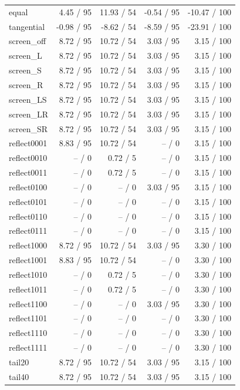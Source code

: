 \begin{longtable}{@{}lrrrr@{}}
equal & 4.45 / 95 & 11.93 / 54 & -0.54 / 95 & -10.47 / 100\\
tangential & -0.98 / 95 & -8.62 / 54 & -8.59 / 95 & -23.91 / 100\\
screen\_\allowbreak off & 8.72 / 95 & 10.72 / 54 & 3.03 / 95 & 3.15 / 100\\
screen\_\allowbreak L & 8.72 / 95 & 10.72 / 54 & 3.03 / 95 & 3.15 / 100\\
screen\_\allowbreak S & 8.72 / 95 & 10.72 / 54 & 3.03 / 95 & 3.15 / 100\\
screen\_\allowbreak R & 8.72 / 95 & 10.72 / 54 & 3.03 / 95 & 3.15 / 100\\
screen\_\allowbreak LS & 8.72 / 95 & 10.72 / 54 & 3.03 / 95 & 3.15 / 100\\
screen\_\allowbreak LR & 8.72 / 95 & 10.72 / 54 & 3.03 / 95 & 3.15 / 100\\
screen\_\allowbreak SR & 8.72 / 95 & 10.72 / 54 & 3.03 / 95 & 3.15 / 100\\
reflect0001 & 8.83 / 95 & 10.72 / 54 & -- / 0 & 3.15 / 100\\
reflect0010 & -- / 0 & 0.72 / 5 & -- / 0 & 3.15 / 100\\
reflect0011 & -- / 0 & 0.72 / 5 & -- / 0 & 3.15 / 100\\
reflect0100 & -- / 0 & -- / 0 & 3.03 / 95 & 3.15 / 100\\
reflect0101 & -- / 0 & -- / 0 & -- / 0 & 3.15 / 100\\
reflect0110 & -- / 0 & -- / 0 & -- / 0 & 3.15 / 100\\
reflect0111 & -- / 0 & -- / 0 & -- / 0 & 3.15 / 100\\
reflect1000 & 8.72 / 95 & 10.72 / 54 & 3.03 / 95 & 3.30 / 100\\
reflect1001 & 8.83 / 95 & 10.72 / 54 & -- / 0 & 3.30 / 100\\
reflect1010 & -- / 0 & 0.72 / 5 & -- / 0 & 3.30 / 100\\
reflect1011 & -- / 0 & 0.72 / 5 & -- / 0 & 3.30 / 100\\
reflect1100 & -- / 0 & -- / 0 & 3.03 / 95 & 3.30 / 100\\
reflect1101 & -- / 0 & -- / 0 & -- / 0 & 3.30 / 100\\
reflect1110 & -- / 0 & -- / 0 & -- / 0 & 3.30 / 100\\
reflect1111 & -- / 0 & -- / 0 & -- / 0 & 3.30 / 100\\
tail20 & 8.72 / 95 & 10.72 / 54 & 3.03 / 95 & 3.15 / 100\\
tail40 & 8.72 / 95 & 10.72 / 54 & 3.03 / 95 & 3.15 / 100\\

\end{longtable}
